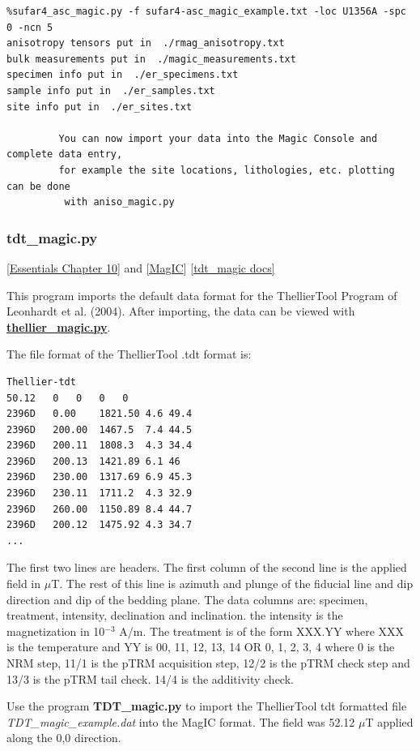 \documentclass[11pt]{book}
\begin{document}
{{{{\begin{verbatim}
%sufar4_asc_magic.py -f sufar4-asc_magic_example.txt -loc U1356A -spc 0 -ncn 5
anisotropy tensors put in  ./rmag_anisotropy.txt
bulk measurements put in  ./magic_measurements.txt
specimen info put in  ./er_specimens.txt
sample info put in  ./er_samples.txt
site info put in  ./er_sites.txt

         You can now import your data into the Magic Console and complete data entry,
         for example the site locations, lithologies, etc. plotting can be done
          with aniso_magic.py
\end{verbatim}



\subsubsection{tdt\_magic.py}
\href{http://earthref.org/MAGIC/books/Tauxe/Essentials/WebBook3ch10.html#ch10}{ [Essentials Chapter 10]} and \href{#MagIC}{[MagIC}]
\href{https://github.com/PmagPy/PmagPy/blob/master/programs/tdt_magic.py}{[tdt\_magic docs]}

This program imports the default data format for the ThellierTool Program of Leonhardt et al. (2004). \nocite{leonhardt04}  After importing, the data can be viewed with \href{#thellier_magic.py}{\bf thellier\_magic.py}.

The file format of the ThellierTool  .tdt format is:
\begin{verbatim}
Thellier-tdt
50.12	0	0	0	0
2396D	0.00	1821.50	4.6	49.4
2396D	200.00	1467.5	7.4	44.5
2396D	200.11	1808.3	4.3	34.4
2396D	200.13	1421.89	6.1	46
2396D	230.00	1317.69	6.9	45.3
2396D	230.11	1711.2	4.3	32.9
2396D	260.00	1150.89	8.4	44.7
2396D	200.12	1475.92	4.3	34.7
...
\end{verbatim}
The first two lines are headers.  The first column of the second line is the applied field in $\mu$T. The rest of this line is azimuth and plunge of the fiducial line and dip direction and dip of the bedding plane.
The data columns are:
specimen, treatment, intensity,  declination and inclination.
the intensity is the magnetization in 10$^{-3}$ A/m.   The treatment is of the form XXX.YY  where XXX is the temperature and YY is   00, 11, 12, 13, 14  OR 0, 1, 2, 3, 4   where 0 is the NRM step, 11/1 is the pTRM acquisition step, 12/2 is the pTRM check step and 13/3 is the pTRM tail check.  14/4 is the additivity check.

Use the program {\bf TDT\_magic.py} to import the ThellierTool tdt formatted file  {\it TDT\_magic\_example.dat} into the MagIC format.   The field was 52.12 $\mu$T applied along the 0,0 direction.

}}}}
\end{document}
